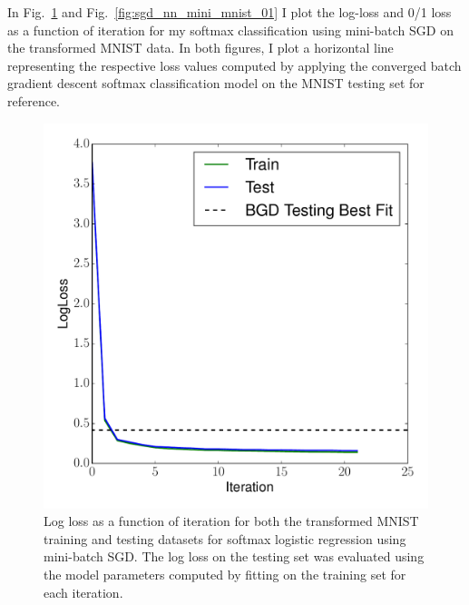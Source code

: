 \documentclass[12pt]{amsart}
\begin{document}
In Fig.~\ref{fig:sgd_nn_mini_mnist_ll} and Fig.~\ref{fig:sgd_nn_mini_mnist_01} I plot the log-loss and 0/1 loss as a function of iteration for my softmax classification using mini-batch SGD on the transformed MNIST data.  In both figures, I plot a horizontal line representing the respective loss values computed by applying the converged batch gradient descent softmax classification model on the MNIST testing set for reference.

\begin{figure}[H]
	\includegraphics[width=\columnwidth]{sgd_nn_mnist_multi_train_test_ll.pdf}
    \caption{Log loss as a function of iteration for both the transformed MNIST training and testing datasets for softmax logistic regression using mini-batch SGD.  The log loss on the testing set was evaluated using the model parameters computed by fitting on the training set for each iteration.}
    \label{fig:sgd_nn_mini_mnist_ll}
\end{figure}
\end{document}
